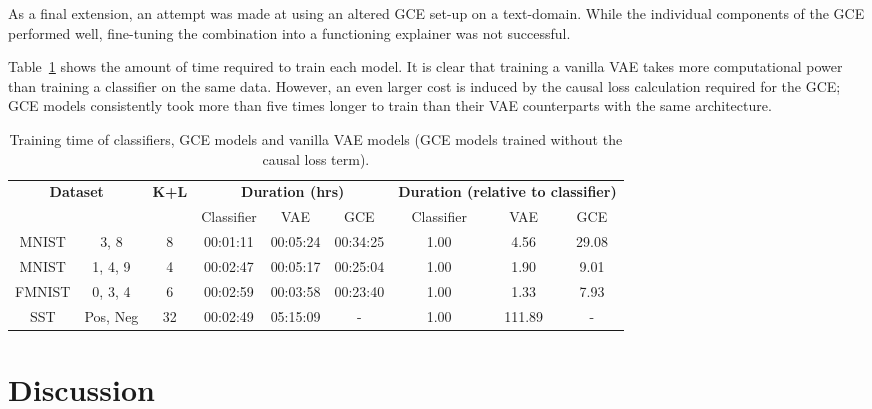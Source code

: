 As a final extension, an attempt was made at using an altered GCE set-up on a text-domain. While the individual components of the GCE performed well, fine-tuning the combination into a functioning explainer was not successful. 

Table~\ref{tab:training_time} shows the amount of time required to train each model. It is clear that training a vanilla VAE takes more computational power than training a classifier on the same data. However, an even larger cost is induced by the causal loss calculation required for the GCE; GCE models consistently took more than five times longer to train than their VAE counterparts with the same architecture.

\begin{table}[t]
   \caption{Training time of classifiers, GCE models and vanilla VAE models (GCE models trained without the causal loss term).} 
   \label{tab:training_time}
   \small
   \centering
   \begin{tabular}{ccccccccc}
    \toprule
    \multicolumn{2}{c}{\multirow{2}[2]{*}{\textbf{Dataset}}} & \multirow{2}[2]{*}{\textbf{K+L}} & \multicolumn{3}{c}{\textbf{Duration (hrs)}} & \multicolumn{3}{c}{\textbf{Duration (relative to classifier)}} \\
    \multicolumn{2}{c}{} &       & Classifier & VAE   & GCE   & Classifier & VAE   & GCE \\
    \midrule
    MNIST & 3, 8  & 8     & 00:01:11 & 00:05:24 & 00:34:25 & 1.00  & 4.56  & 29.08 \\
    MNIST  & 1, 4, 9 & 4  & 00:02:47 & 00:05:17 & 00:25:04 & 1.00  & 1.90  & 9.01 \\
    FMNIST & 0, 3, 4 & 6  & 00:02:59 & 00:03:58 & 00:23:40 & 1.00  & 1.33  & 7.93 \\
    SST   & Pos, Neg & 32 & 00:02:49 & 05:15:09 & -  & 1.00  & 111.89 & - \\
    \bottomrule
    \end{tabular}
\end{table}

\section{Discussion}

